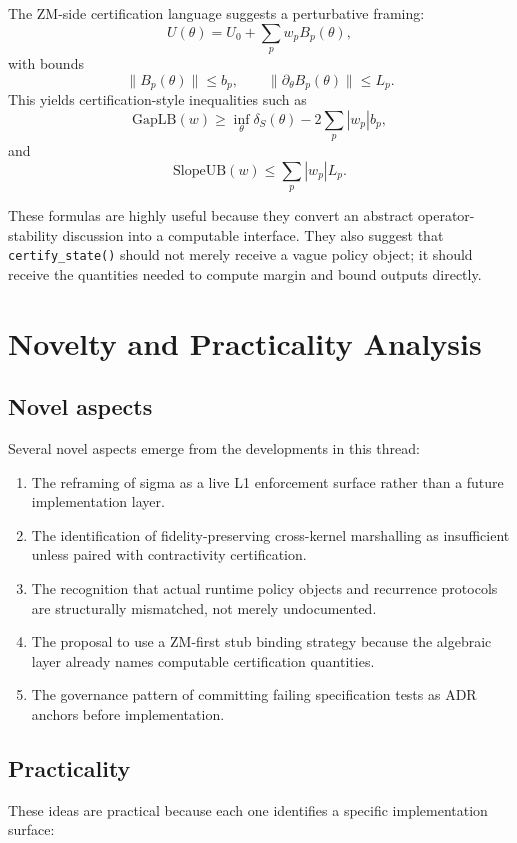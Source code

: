 \documentclass[11pt]{article}
\begin{document}
The ZM-side certification language suggests a perturbative framing:
\[
U(\theta) = U_0 + \sum_p w_p B_p(\theta),
\]
with bounds
\[
\|B_p(\theta)\| \le b_p,
\qquad
\|\partial_\theta B_p(\theta)\| \le L_p.
\]
This yields certification-style inequalities such as
\[
\mathrm{GapLB}(w) \ge \inf_\theta \delta_S(\theta) - 2\sum_p |w_p|b_p,
\]
and
\[
\mathrm{SlopeUB}(w) \le \sum_p |w_p|L_p.
\]

These formulas are highly useful because they convert an abstract operator-stability discussion into a computable interface. They also suggest that \texttt{certify\_state()} should not merely receive a vague policy object; it should receive the quantities needed to compute margin and bound outputs directly.

\section{Novelty and Practicality Analysis}

\subsection{Novel aspects}

Several novel aspects emerge from the developments in this thread:

\begin{enumerate}[label=\arabic*.]
\item The reframing of sigma as a live L1 enforcement surface rather than a future implementation layer.
\item The identification of fidelity-preserving cross-kernel marshalling as insufficient unless paired with contractivity certification.
\item The recognition that actual runtime policy objects and recurrence protocols are structurally mismatched, not merely undocumented.
\item The proposal to use a ZM-first stub binding strategy because the algebraic layer already names computable certification quantities.
\item The governance pattern of committing failing specification tests as ADR anchors before implementation.
\end{enumerate}

\subsection{Practicality}

These ideas are practical because each one identifies a specific implementation surface:
\end{document}
